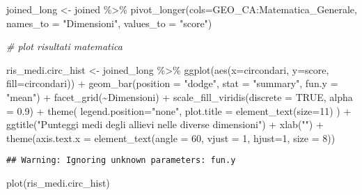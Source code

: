 \documentclass[
]{book}
\newenvironment{Shaded}{\begin{snugshade}}{\end{snugshade}}
\newcommand{\AttributeTok}[1]{\textcolor[rgb]{0.77,0.63,0.00}{#1}}
\newcommand{\CommentTok}[1]{\textcolor[rgb]{0.56,0.35,0.01}{\textit{#1}}}
\newcommand{\ConstantTok}[1]{\textcolor[rgb]{0.00,0.00,0.00}{#1}}
\newcommand{\DecValTok}[1]{\textcolor[rgb]{0.00,0.00,0.81}{#1}}
\newcommand{\FloatTok}[1]{\textcolor[rgb]{0.00,0.00,0.81}{#1}}
\newcommand{\FunctionTok}[1]{\textcolor[rgb]{0.00,0.00,0.00}{#1}}
\newcommand{\NormalTok}[1]{#1}
\newcommand{\OtherTok}[1]{\textcolor[rgb]{0.56,0.35,0.01}{#1}}
\newcommand{\SpecialCharTok}[1]{\textcolor[rgb]{0.00,0.00,0.00}{#1}}
\newcommand{\StringTok}[1]{\textcolor[rgb]{0.31,0.60,0.02}{#1}}
\begin{document}
\begin{Shaded}
\begin{Highlighting}[]
\NormalTok{joined\_long }\OtherTok{\textless{}{-}}\NormalTok{ joined }\SpecialCharTok{\%\textgreater{}\%}
  \FunctionTok{pivot\_longer}\NormalTok{(}\AttributeTok{cols=}\NormalTok{GEO\_CA}\SpecialCharTok{:}\NormalTok{Matematica\_Generale, }\AttributeTok{names\_to =} \StringTok{"Dimensioni"}\NormalTok{, }\AttributeTok{values\_to =} \StringTok{"score"}\NormalTok{)}

\CommentTok{\# plot risultati matematica}

\NormalTok{ris\_medi.circ\_hist }\OtherTok{\textless{}{-}}\NormalTok{ joined\_long }\SpecialCharTok{\%\textgreater{}\%}
  \FunctionTok{ggplot}\NormalTok{(}\FunctionTok{aes}\NormalTok{(}\AttributeTok{x=}\NormalTok{circondari, }\AttributeTok{y=}\NormalTok{score, }\AttributeTok{fill=}\NormalTok{circondari)) }\SpecialCharTok{+}
  \FunctionTok{geom\_bar}\NormalTok{(}\AttributeTok{position =} \StringTok{"dodge"}\NormalTok{, }\AttributeTok{stat =} \StringTok{"summary"}\NormalTok{, }\AttributeTok{fun.y =} \StringTok{"mean"}\NormalTok{) }\SpecialCharTok{+}
  \FunctionTok{facet\_grid}\NormalTok{(}\SpecialCharTok{\textasciitilde{}}\NormalTok{Dimensioni) }\SpecialCharTok{+}
  \FunctionTok{scale\_fill\_viridis}\NormalTok{(}\AttributeTok{discrete =} \ConstantTok{TRUE}\NormalTok{, }\AttributeTok{alpha =} \FloatTok{0.9}\NormalTok{) }\SpecialCharTok{+}
  \FunctionTok{theme}\NormalTok{(}
    \AttributeTok{legend.position=}\StringTok{"none"}\NormalTok{,}
    \AttributeTok{plot.title =} \FunctionTok{element\_text}\NormalTok{(}\AttributeTok{size=}\DecValTok{11}\NormalTok{)}
\NormalTok{  ) }\SpecialCharTok{+}
  \FunctionTok{ggtitle}\NormalTok{(}\StringTok{"Punteggi medi degli allievi nelle diverse dimensioni"}\NormalTok{) }\SpecialCharTok{+}
  \FunctionTok{xlab}\NormalTok{(}\StringTok{""}\NormalTok{) }\SpecialCharTok{+}
  \FunctionTok{theme}\NormalTok{(}\AttributeTok{axis.text.x =} \FunctionTok{element\_text}\NormalTok{(}\AttributeTok{angle =} \DecValTok{60}\NormalTok{, }\AttributeTok{vjust =} \DecValTok{1}\NormalTok{, }\AttributeTok{hjust=}\DecValTok{1}\NormalTok{, }\AttributeTok{size =} \DecValTok{8}\NormalTok{))}
\end{Highlighting}
\end{Shaded}

\begin{verbatim}
## Warning: Ignoring unknown parameters: fun.y
\end{verbatim}

\begin{Shaded}
\begin{Highlighting}[]
\FunctionTok{plot}\NormalTok{(ris\_medi.circ\_hist)}
\end{Highlighting}
\end{Shaded}
\end{document}
